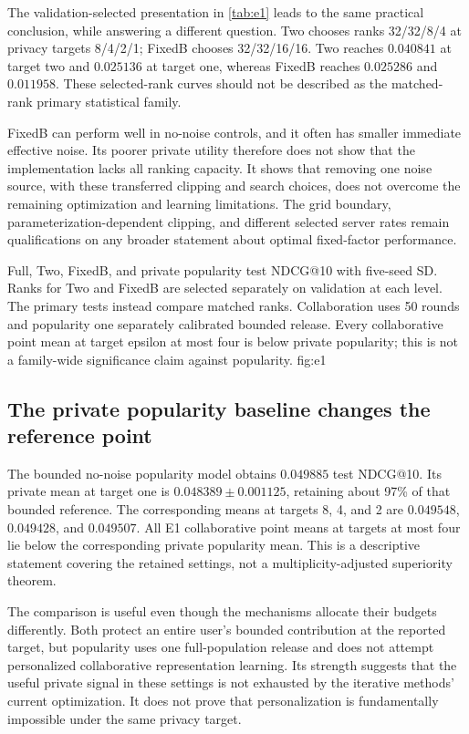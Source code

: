 The validation-selected presentation in \cref{tab:e1} leads to the same
practical conclusion, while answering a different question. Two chooses
ranks 32/32/8/4 at privacy targets 8/4/2/1; FixedB chooses 32/32/16/16.
Two reaches $0.040841$ at target two and $0.025136$ at target one, whereas
FixedB reaches $0.025286$ and $0.011958$. These selected-rank curves should
not be described as the matched-rank primary statistical family.

FixedB can perform well in no-noise controls, and it often has smaller
immediate effective noise. Its poorer private utility therefore does not
show that the implementation lacks all ranking capacity. It shows that
removing one noise source, with these transferred clipping and search choices,
does not overcome the remaining optimization and learning limitations.
The grid boundary, parameterization-dependent clipping, and different selected
server rates remain qualifications on any broader statement about optimal
fixed-factor performance.

{Full, Two, FixedB, and private popularity test NDCG@10 with five-seed SD.
Ranks for Two and FixedB are selected separately on validation at each level.
The primary tests instead compare matched ranks. Collaboration uses 50
rounds and popularity one separately calibrated bounded release. Every
collaborative point mean at target epsilon at most four is below private
popularity; this is not a family-wide significance claim against popularity.}
{fig:e1}

\subsection{The private popularity baseline changes the reference point}
The bounded no-noise popularity model obtains $0.049885$ test NDCG@10.
Its private mean at target one is $0.048389\pm0.001125$, retaining about
97\% of that bounded reference. The corresponding means at targets 8, 4,
and 2 are $0.049548$, $0.049428$, and $0.049507$. All E1 collaborative
point means at targets at most four lie below the corresponding private
popularity mean. This is a descriptive statement covering the retained
settings, not a multiplicity-adjusted superiority theorem.

The comparison is useful even though the mechanisms allocate their budgets
differently. Both protect an entire user's bounded contribution at the
reported target, but popularity uses one full-population release and does
not attempt personalized collaborative representation learning. Its strength
suggests that the useful private signal in these settings is not exhausted
by the iterative methods' current optimization. It does not prove that
personalization is fundamentally impossible under the same privacy target.

